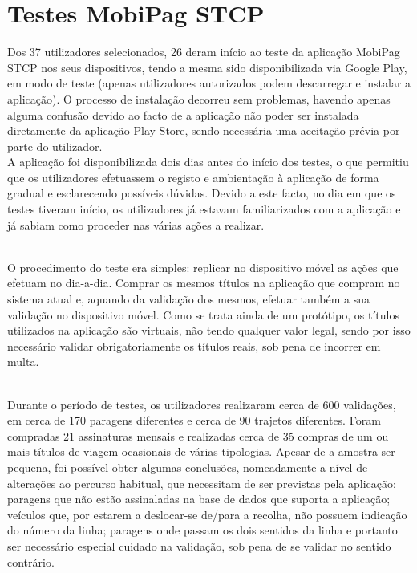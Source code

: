 \section{Testes MobiPag STCP}

Dos 37 utilizadores selecionados, 26 deram início ao teste da aplicação MobiPag STCP nos seus dispositivos, tendo a mesma sido disponibilizada via Google Play, em modo de teste (apenas utilizadores autorizados podem descarregar e instalar a aplicação). O processo de instalação decorreu sem problemas, havendo apenas alguma confusão devido ao facto de a aplicação não poder ser instalada diretamente da aplicação Play Store, sendo necessária uma aceitação prévia por parte do utilizador.
\\A aplicação foi disponibilizada dois dias antes do início dos testes, o que permitiu que os utilizadores efetuassem o registo e ambientação à aplicação de forma gradual e esclarecendo possíveis dúvidas. Devido a este facto, no dia em que os testes tiveram início, os utilizadores já estavam familiarizados com a aplicação e já sabiam como proceder nas várias ações a realizar.

~\\O procedimento do teste era simples: replicar no dispositivo móvel as ações que efetuam no dia-a-dia. Comprar os mesmos títulos na aplicação que compram no sistema atual e, aquando da validação dos mesmos, efetuar também a sua validação no dispositivo móvel. Como se trata ainda de um protótipo, os títulos utilizados na aplicação são virtuais, não tendo qualquer valor legal, sendo por isso necessário validar obrigatoriamente os títulos reais, sob pena de incorrer em multa.

~\\Durante o período de testes, os utilizadores realizaram cerca de 600 validações, em cerca de 170 paragens diferentes e cerca de 90 trajetos diferentes. Foram compradas 21 assinaturas mensais e realizadas cerca de 35 compras de um ou mais títulos de viagem ocasionais de várias tipologias. Apesar de a amostra ser pequena, foi possível obter algumas conclusões, nomeadamente a nível de alterações ao percurso habitual, que necessitam de ser previstas pela aplicação; paragens que não estão assinaladas na base de dados que suporta a aplicação; veículos que, por estarem a deslocar-se de/para a recolha, não possuem indicação do número da linha; paragens onde passam os dois sentidos da linha e portanto ser necessário especial cuidado na validação, sob pena de se validar no sentido contrário.


